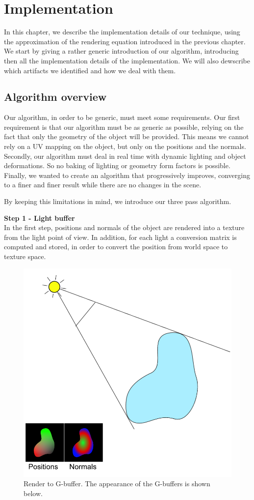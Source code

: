 \chapter{Implementation}

In this chapter, we describe the implementation details of our technique, using the approximation of the rendering equation introduced in the previous chapter. We start by giving a rather generic introduction of our algorithm, introducing then all the implementation details of the implementation. We will also dewscribe which artifacts we identified and how we deal with them.

\section{Algorithm overview}

Our algorithm, in order to be generic, must meet some requirements. Our first requirement is that our algorithm must be as generic as possible, relying on the fact that only the geometry of the object will be provided. This means we cannot rely on a UV mapping on the object, but only on the positions and the normals. Secondly, our algorithm must deal in real time with dynamic lighting and object deformations. So no baking of lighting or geometry form factors is possible. Finally, we wanted to create an algorithm that progressively improves, converging to a finer and finer result while there are no changes in the scene.

By keeping this limitations in mind, we introduce our three pass algorithm.

\textbf{Step 1 - Light buffer} \\
In the first step, positions and normals of the object are rendered into a texture from the light point of view. In addition, for each light a conversion matrix is computed and stored, in order to convert the position from world space to texture space. 

\begin{figure}[!ht]
\centering
\includegraphics[width=0.5 \linewidth]{images/method/method_step1}
\caption{Render to G-buffer. The appearance of the G-buffers is shown below.}
\label{fig:step1}
\end{figure} 


